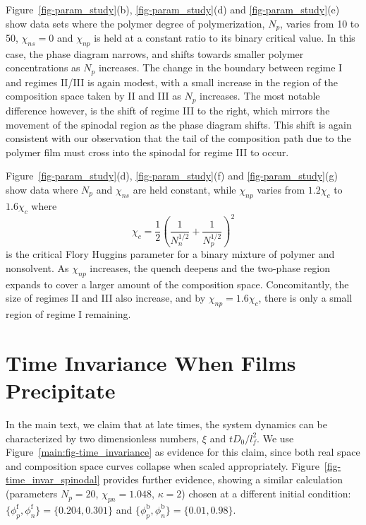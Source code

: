 \documentclass[journal=mamobx,manuscript=suppinfo]{achemso}
\newcommand{\txtf}{\mathrm{f}}
\newcommand{\txtb}{\mathrm{b}}
\begin{document}
Figure~\ref{fig-param_study}(b), \ref{fig-param_study}(d) and \ref{fig-param_study}(e) show data sets where the polymer degree of polymerization, $N_{p}$, varies from 10 to 50, $\chi_{ns} = 0$ and $\chi_{np}$ is held at a constant ratio to its binary critical value.
In this case, the phase diagram narrows, and shifts towards smaller polymer concentrations as $N_{p}$ increases.
The change in the boundary between regime I and regimes II/III is again modest, with a small increase in the region of the composition space taken by II and III as $N_{p}$ increases.
The most notable difference however, is the shift of regime III to the right, which mirrors the movement of the spinodal region as the phase diagram shifts.
This shift is again consistent with our observation that the tail of the composition path due to the polymer film must cross into the spinodal for regime III to occur.

Figure~\ref{fig-param_study}(d), \ref{fig-param_study}(f) and \ref{fig-param_study}(g) show data where $N_{p}$ and $\chi_{ns}$ are held constant, while $\chi_{np}$ varies from $1.2 \chi_{c}$ to $1.6 \chi_{c}$ where 
\begin{equation}
\chi_{c} = \frac{1}{2}\left ( \frac{1}{ N_{n}^{1/2} } + \frac{1}{ N_{p}^{1/2} }\right )^{2}
\end{equation}
is the critical Flory Huggins parameter for a binary mixture of polymer and nonsolvent.
As $\chi_{np}$ increases, the quench deepens and the two-phase region expands to cover a larger amount of the composition space.
Concomitantly, the size of regimes II and III also increase, and by $\chi_{np} = 1.6 \chi_{c}$, there is only a small region of regime I remaining.

\section{Time Invariance When Films Precipitate}
In the main text, we claim that at late times, the system dynamics can be characterized by two dimensionless numbers, $\xi$ and $t D_{0}/l_{f}^{2}$.
We use Figure~\ref{main:fig-time_invariance} as evidence for this claim, since both real space and composition space curves collapse when scaled appropriately.
Figure~\ref{fig-time_invar_spinodal} provides further evidence, showing a similar calculation (parameters $N_{p} = 20$, $\chi_{pn} = 1.048$, $\kappa = 2$) chosen at a different initial condition: $\{\phi_{p}^{\txtf}, \phi_{n}^{\txtf}\} = \{0.204, 0.301\}$ and $\{\phi_{p}^{\txtb}, \phi_{n}^{\txtb}\} = \{0.01, 0.98\}$.
\end{document}
